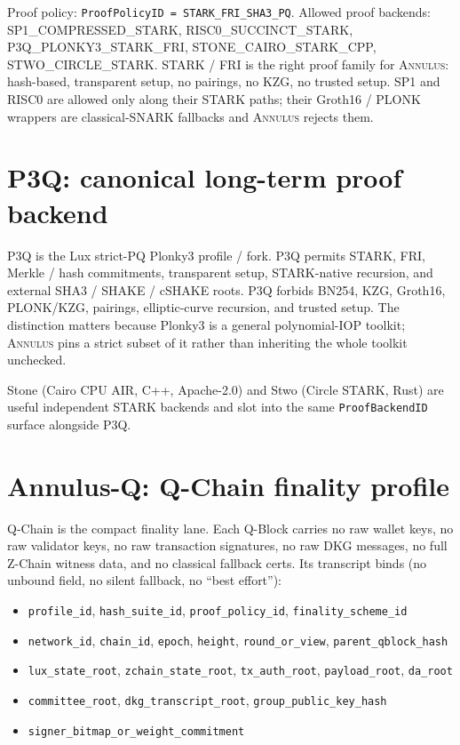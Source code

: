\documentclass[11pt,a4paper]{article}
\newcommand{\Annulus}{\textsc{Annulus}}
\begin{document}
\noindent
Proof policy: \texttt{ProofPolicyID = STARK\_FRI\_SHA3\_PQ}.
Allowed proof backends: SP1\_COMPRESSED\_STARK,
RISC0\_SUCCINCT\_STARK, P3Q\_PLONKY3\_STARK\_FRI,
STONE\_CAIRO\_STARK\_CPP, STWO\_CIRCLE\_STARK. STARK / FRI is the
right proof family for \Annulus{}: hash-based, transparent setup,
no pairings, no KZG, no trusted setup. SP1 and RISC0 are allowed
only along their STARK paths; their Groth16 / PLONK wrappers are
classical-SNARK fallbacks and \Annulus{} rejects them.

\section{P3Q: canonical long-term proof backend}
\label{sec:p3q}

P3Q is the Lux strict-PQ Plonky3 profile / fork. P3Q permits STARK,
FRI, Merkle / hash commitments, transparent setup, STARK-native
recursion, and external SHA3 / SHAKE / cSHAKE roots. P3Q forbids
BN254, KZG, Groth16, PLONK/KZG, pairings, elliptic-curve recursion,
and trusted setup. The distinction matters because Plonky3 is a
general polynomial-IOP toolkit; \Annulus{} pins a strict subset of
it rather than inheriting the whole toolkit unchecked.

Stone (Cairo CPU AIR, C++, Apache-2.0) and Stwo (Circle STARK,
Rust) are useful independent STARK backends and slot into the same
\texttt{ProofBackendID} surface alongside P3Q.

\section{Annulus-Q: Q-Chain finality profile}
\label{sec:annulus-q}

Q-Chain is the compact finality lane. Each Q-Block carries no raw
wallet keys, no raw validator keys, no raw transaction signatures,
no raw DKG messages, no full Z-Chain witness data, and no
classical fallback certs. Its transcript binds (no unbound field,
no silent fallback, no ``best effort''):

\begin{itemize}[leftmargin=*, itemsep=0pt]
\item \texttt{profile\_id}, \texttt{hash\_suite\_id},
\texttt{proof\_policy\_id}, \texttt{finality\_scheme\_id}
\item \texttt{network\_id}, \texttt{chain\_id}, \texttt{epoch},
\texttt{height}, \texttt{round\_or\_view},
\texttt{parent\_qblock\_hash}
\item \texttt{lux\_state\_root}, \texttt{zchain\_state\_root},
\texttt{tx\_auth\_root}, \texttt{payload\_root},
\texttt{da\_root}
\item \texttt{committee\_root}, \texttt{dkg\_transcript\_root},
\texttt{group\_public\_key\_hash}
\item \texttt{signer\_bitmap\_or\_weight\_commitment}
\end{itemize}
\end{document}
